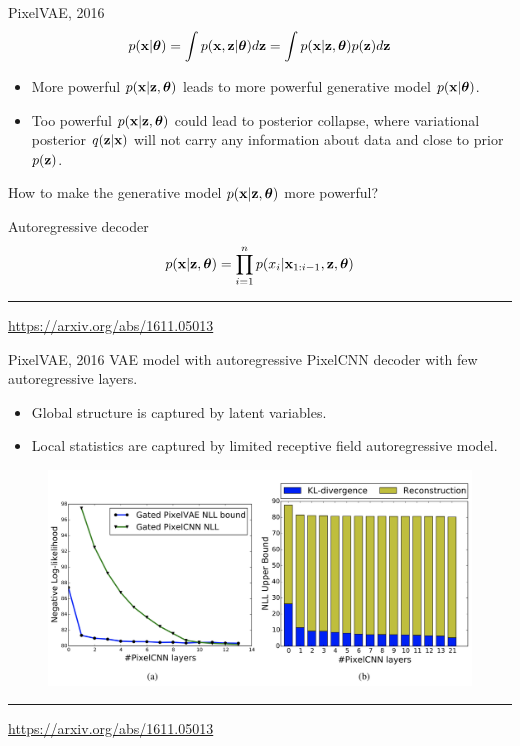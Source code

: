 \begin{frame}{PixelVAE, 2016}
	\[
	    p(\mathbf{x} | \boldsymbol{\theta}) = \int p(\mathbf{x}, \mathbf{z} | \boldsymbol{\theta}) d \mathbf{z} = \int p(\mathbf{x} | \mathbf{z}, \boldsymbol{\theta}) p(\mathbf{z}) d \mathbf{z} 
	\]
	\begin{itemize}
		\item More powerful $p(\mathbf{x} | \mathbf{z}, \boldsymbol{\theta})$ leads to more powerful generative model $p(\mathbf{x} | \boldsymbol{\theta})$.
		\item Too powerful $p(\mathbf{x} | \mathbf{z}, \boldsymbol{\theta})$ could lead to posterior collapse, where variational posterior $q(\mathbf{z} | \mathbf{x})$ will not carry any information about data and close to prior $p(\mathbf{z})$.
	\end{itemize}
	How to make the generative model $p(\mathbf{x} | \mathbf{z}, \boldsymbol{\theta})$ more powerful?
	\begin{block}{Autoregressive decoder}
	\[
	    p(\mathbf{x} | \mathbf{z} , \boldsymbol{\theta}) = \prod_{i=1}^n p(x_i | \mathbf{x}_{1:i - 1}, \mathbf{z} , \boldsymbol{\theta})
	\]
	\end{block}
	
	\vfill
	\hrule\medskip
	{\scriptsize \href{https://arxiv.org/abs/1611.05013}{https://arxiv.org/abs/1611.05013}}
\end{frame}
\begin{frame}{PixelVAE, 2016}
	VAE model with autoregressive PixelCNN decoder with few autoregressive layers. 
	\begin{itemize}
		\item Global structure is captured by latent variables.
		\item Local statistics are captured by limited receptive field autoregressive model.
	\end{itemize}
	\begin{figure}
	    \centering
	    \includegraphics[width=0.8\linewidth]{figs/PixelVAE_2.png}
	\end{figure}
	\vfill
	\hrule\medskip
	{\scriptsize \href{https://arxiv.org/abs/1611.05013}{https://arxiv.org/abs/1611.05013}}
\end{frame}

